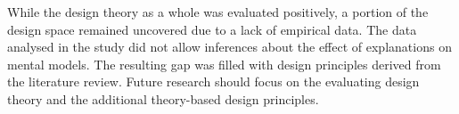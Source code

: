 While the design theory as a whole was evaluated positively, a portion of the design space remained uncovered due to a lack of empirical data. The data analysed in the study did not allow inferences about the effect of explanations on mental models. The resulting gap was filled with design principles derived from the literature review. Future research should focus on the evaluating design theory and the additional theory-based design principles.
